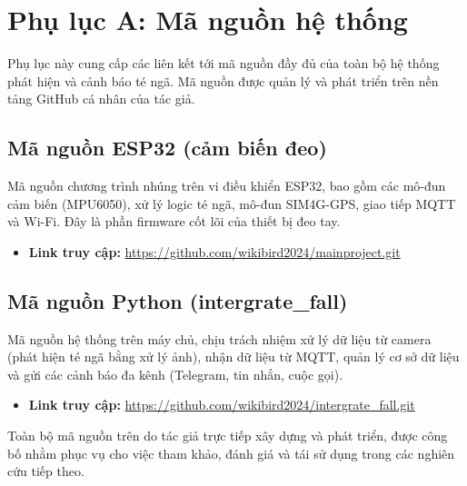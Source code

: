 \chapter{Phụ lục A: Mã nguồn hệ thống}

Phụ lục này cung cấp các liên kết tới mã nguồn đầy đủ của toàn bộ hệ thống phát hiện và cảnh báo té ngã. Mã nguồn được quản lý và phát triển trên nền tảng GitHub cá nhân của tác giả.

\section{Mã nguồn ESP32 (cảm biến đeo)}
Mã nguồn chương trình nhúng trên vi điều khiển ESP32, bao gồm các mô-đun cảm biến (MPU6050), xử lý logic té ngã, mô-đun SIM4G-GPS, giao tiếp MQTT và Wi-Fi. Đây là phần firmware cốt lõi của thiết bị đeo tay.

\begin{itemize}
    \item \textbf{Link truy cập:} \url{https://github.com/wikibird2024/mainproject.git}
\end{itemize}

\section{Mã nguồn Python (intergrate\_fall)}
Mã nguồn hệ thống trên máy chủ, chịu trách nhiệm xử lý dữ liệu từ camera (phát hiện té ngã bằng xử lý ảnh), nhận dữ liệu từ MQTT, quản lý cơ sở dữ liệu và gửi các cảnh báo đa kênh (Telegram, tin nhắn, cuộc gọi).

\begin{itemize}
    \item \textbf{Link truy cập:} \url{https://github.com/wikibird2024/intergrate_fall.git}
\end{itemize}

\vspace{1cm}
Toàn bộ mã nguồn trên do tác giả \TENTACGIA{} trực tiếp xây dựng và phát triển, được công bố nhằm phục vụ cho việc tham khảo, đánh giá và tái sử dụng trong các nghiên cứu tiếp theo.
